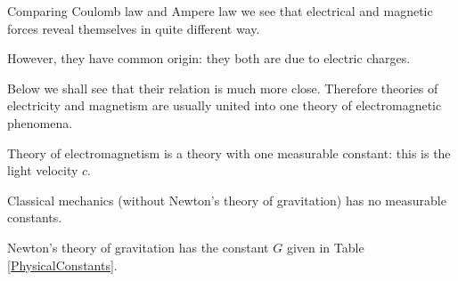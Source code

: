 \documentclass[10pt]{beamer}
\begin{document}
\begin{frame}[fragile]{}
Comparing Coulomb law and Ampere law we see that electrical and
magnetic forces reveal themselves in quite different way. 

However,
they have common origin: they both are due to electric charges.


Below we shall see that their relation is much more close. Therefore
theories of electricity and magnetism are usually united into one
theory of \alert{electromagnetic} phenomena. 

\alert{Theory of electromagnetism is
a theory with one measurable constant: this is the light velocity $c$}.

Classical mechanics (without Newton's theory of gravitation) has no
measurable constants. 

Newton's theory of gravitation has the  constant $G$ given in Table \ref{PhysicalConstants}.



\end{frame}
%
%
%
%
%
%
%
%
%

\end{document}
